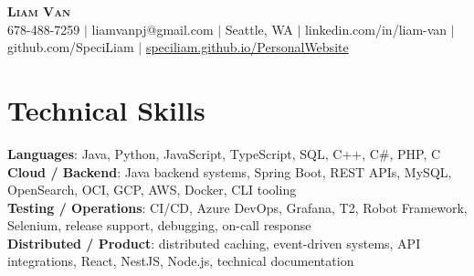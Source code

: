 \documentclass[letterpaper,11pt]{article}
\begin{document}

%
\begin{center}
    \textbf{\Huge \scshape Liam Van} \\ \vspace{1pt}
    \small 678-488-7259 $|$ \small {liamvanpj@gmail.com} $|$ Seattle, WA
 {{$|$ linkedin.com/in/liam-van} {$|$ github.com/SpeciLiam} {$|$ \href{https://speciliam.github.io/PersonalWebsite}{speciliam.github.io/PersonalWebsite}}}

\end{center}

\section{Technical Skills}
 \begin{itemize}[leftmargin=0.15in, label={}]
    \small{\item{
     \textbf{Languages}{: Java, Python, JavaScript, TypeScript, SQL, C++, C\#, PHP, C} \\
     \textbf{Cloud / Backend}{: Java backend systems, Spring Boot, REST APIs, MySQL, OpenSearch, OCI, GCP, AWS, Docker, CLI tooling} \\
     \textbf{Testing / Operations}{: CI/CD, Azure DevOps, Grafana, T2, Robot Framework, Selenium, release support, debugging, on-call response} \\
     \textbf{Distributed / Product}{: distributed caching, event-driven systems, API integrations, React, NestJS, Node.js, technical documentation} \\
    }}
 \end{itemize}
%
\end{document}
